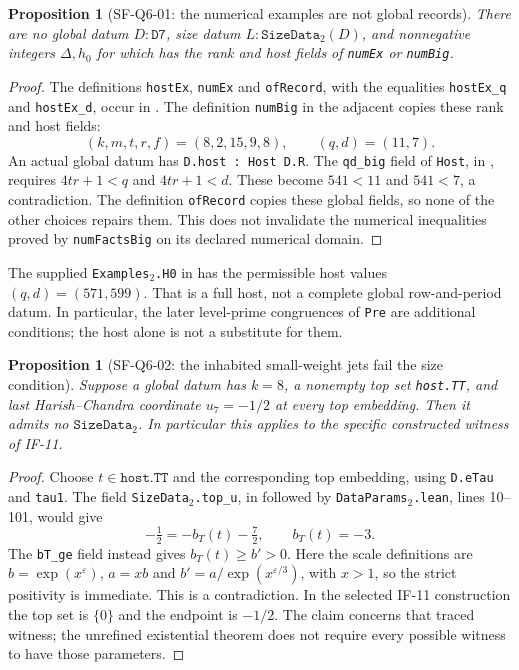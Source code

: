 \documentclass[11pt,a4paper]{article}
\newtheorem{proposition}[theorem]{Proposition}
\theoremstyle{definition}
\theoremstyle{remark}
\begin{document}
\begin{proposition}[SF-Q6-01: the numerical examples are not global records]
There are no global datum $D:\texttt{D7}$, size datum
$L:\texttt{SizeData}_2(D)$, and nonnegative integers
$\Delta,h_0$ for which  has
the rank and host fields of \texttt{numEx} or \texttt{numBig}.
\end{proposition}
\begin{proof}
The definitions \texttt{hostEx}, \texttt{numEx} and
\texttt{ofRecord}, with the equalities \texttt{hostEx\_q} and
\texttt{hostEx\_d}, occur in
.
The definition \texttt{numBig} in the adjacent
 copies these rank and host fields:
\[
 (k,m,t,r,f)=(8,2,15,9,8),\qquad(q,d)=(11,7).
\]
An actual global datum has \texttt{D.host : Host D.R}.
The \texttt{qd\_big} field of \texttt{Host}, in
, requires
$4tr+1<q$ and $4tr+1<d$. These become $541<11$ and
$541<7$, a contradiction. The definition \texttt{ofRecord}
copies these global fields, so none of the other choices repairs
them. This does not invalidate the numerical inequalities proved
by \texttt{numFactsBig} on its declared numerical domain.
\end{proof}

The supplied \texttt{Examples}\(_2\)\texttt{.H0} in
has the permissible host values $(q,d)=(571,599)$. That is a full
host, not a complete global row-and-period datum. In particular,
the later level-prime congruences of \texttt{Pre} are additional
conditions; the host alone is not a substitute for them.

\begin{proposition}[SF-Q6-02: the inhabited small-weight jets fail the size condition]
Suppose a global datum has $k=8$, a nonempty top set
\texttt{host.TT}, and last Harish--Chandra coordinate
$u_7=-1/2$ at every top embedding. Then it admits no
$\texttt{SizeData}_2$. In particular this applies to the
specific constructed witness of IF-11.
\end{proposition}
\begin{proof}
Choose $t\in\texttt{host.TT}$ and the corresponding top embedding,
using \texttt{D.eTau} and \texttt{tau1}. The field
\texttt{SizeData}\(_2\)\texttt{.top\_u}, in
 followed by
\texttt{DataParams}\(_2\)\texttt{.lean}, lines 10--101,
would give
\[
 -\tfrac12=-b_T(t)-\tfrac72,\qquad b_T(t)=-3.
\]
The \texttt{bT\_ge} field instead gives $b_T(t)\ge b'>0$.
Here the scale definitions are
$b=\exp(x^\varepsilon)$, $a=xb$ and
$b'=a/\exp(x^{\varepsilon/3})$, with $x>1$, so the strict
positivity is immediate. This is a contradiction. In the selected
IF-11 construction the top set is $\{0\}$ and the endpoint is
$-1/2$. The claim concerns that traced witness; the unrefined
existential theorem does not require every possible witness to
have those parameters.
\end{proof}
\end{document}
